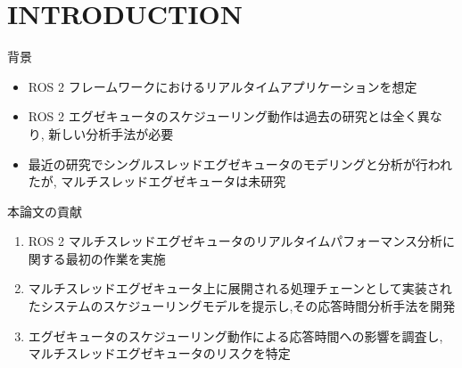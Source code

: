 
\section{INTRODUCTION}
\label{sec: introduction}

\begin{frame}{背景}
    \begin{itemize}
        \item ROS 2 フレームワークにおけるリアルタイムアプリケーションを想定
        \item ROS 2 エグゼキュータのスケジューリング動作は過去の研究とは全く異なり, 新しい分析手法が必要
        \item 最近の研究でシングルスレッドエグゼキュータのモデリングと分析が行われたが, マルチスレッドエグゼキュータは未研究
    \end{itemize}
\end{frame}

\begin{frame}{本論文の貢献}
    \begin{enumerate}
        \item ROS 2 マルチスレッドエグゼキュータのリアルタイムパフォーマンス分析に関する最初の作業を実施
        \item マルチスレッドエグゼキュータ上に展開される処理チェーンとして実装されたシステムのスケジューリングモデルを提示し,その応答時間分析手法を開発
        \item エグゼキュータのスケジューリング動作による応答時間への影響を調査し, マルチスレッドエグゼキュータのリスクを特定
    \end{enumerate}
\end{frame}
